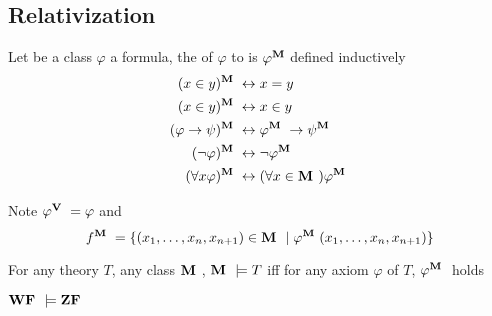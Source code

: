 \documentclass[11pt]{article}
\begin{document}
\subsection{Relativization}
\label{sec:orge1e321a}
\begin{definition}[]
Let  be a class \(\varphi\) a formula, the  of \(\varphi\)
to  is \(\varphi^{\textbf{M}}\) defined inductively
\begin{align*}
(x\in y)^{\textbf{M }}&\leftrightarrow x=y\\
(x\in y)^{\textbf{M }}&\leftrightarrow x\in y\\
(\varphi\to\psi)^{\textbf{M }}&\leftrightarrow \varphi^{\textbf{M }}\to\psi^{\textbf{M }}\\
(\neg\varphi)^{\textbf{M }}&\leftrightarrow\neg\varphi^{\textbf{M }}\\
(\forall x\varphi)^{\textbf{M }}&\leftrightarrow(\forall x\in\textbf{M })\varphi^{\textbf{M }}
\end{align*}
\end{definition}

Note \(\varphi^{\textbf{V }}=\varphi\) and
\begin{equation*}
f^{\textbf{M }}=\{(x_1,\dots,x_n,x_{n+1})\in\textbf{M }\mid\varphi^{\textbf{M }}(x_1,\dots,x_n,x_{n+1})\}
\end{equation*}

\begin{definition}[]
For any theory \(T\), any class \(\textbf{M }\), \(\textbf{M }\models T\) iff for any axiom
\(\varphi\) of \(T\), \(\varphi^{\textbf{M }}\) holds
\end{definition}


\begin{theorem}[\zfm]
\(\textbf{WF }\models\textbf{ZF }\)
\end{theorem}
\end{document}
